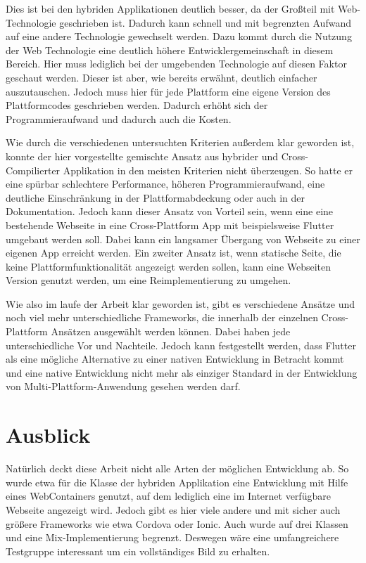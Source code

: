 Dies ist bei den hybriden Applikationen deutlich besser, da der Großteil mit Web-Technologie geschrieben ist. Dadurch kann schnell und mit begrenzten Aufwand auf eine andere Technologie gewechselt werden. Dazu kommt durch die Nutzung der Web Technologie eine deutlich höhere Entwicklergemeinschaft in diesem Bereich. Hier muss lediglich bei der umgebenden Technologie auf diesen Faktor geschaut werden. Dieser ist aber, wie bereits erwähnt, deutlich einfacher auszutauschen. Jedoch muss hier für jede Plattform eine eigene Version des Plattformcodes geschrieben werden. Dadurch erhöht sich der Programmieraufwand und dadurch auch die Kosten.

Wie durch die verschiedenen untersuchten Kriterien außerdem klar geworden ist, konnte der hier vorgestellte gemischte Ansatz aus hybrider und Cross-Compilierter Applikation in den meisten Kriterien nicht überzeugen. So hatte er eine spürbar schlechtere Performance, höheren Programmieraufwand, eine deutliche Einschränkung in der Plattformabdeckung oder auch in der Dokumentation. Jedoch kann dieser Ansatz von Vorteil sein, wenn eine eine bestehende Webseite in eine Cross-Plattform App mit beispielsweise Flutter umgebaut werden soll. Dabei kann ein langsamer Übergang von Webseite zu einer eigenen App erreicht werden. Ein zweiter Ansatz ist, wenn statische Seite, die keine Plattformfunktionalität angezeigt werden sollen, kann eine Webseiten Version genutzt werden, um eine Reimplementierung zu umgehen.

Wie also im laufe der Arbeit klar geworden ist, gibt es verschiedene Ansätze und noch viel mehr unterschiedliche Frameworks, die innerhalb der einzelnen Cross-Plattform Ansätzen ausgewählt werden können. Dabei haben jede unterschiedliche Vor und Nachteile. Jedoch kann festgestellt werden, dass Flutter als eine mögliche Alternative zu einer nativen Entwicklung in Betracht kommt und eine native Entwicklung nicht mehr als einziger Standard in der Entwicklung von Multi-Plattform-Anwendung gesehen werden darf.

\section{Ausblick}
Natürlich deckt diese Arbeit nicht alle Arten der möglichen Entwicklung ab. So wurde etwa für die Klasse der hybriden Applikation eine Entwicklung mit Hilfe eines WebContainers genutzt, auf dem lediglich eine im Internet verfügbare Webseite angezeigt wird. Jedoch gibt es hier viele andere und mit sicher auch größere Frameworks wie etwa Cordova oder Ionic. Auch wurde auf drei Klassen und eine Mix-Implementierung begrenzt. Deswegen wäre eine umfangreichere Testgruppe interessant um ein vollständiges Bild zu erhalten.

